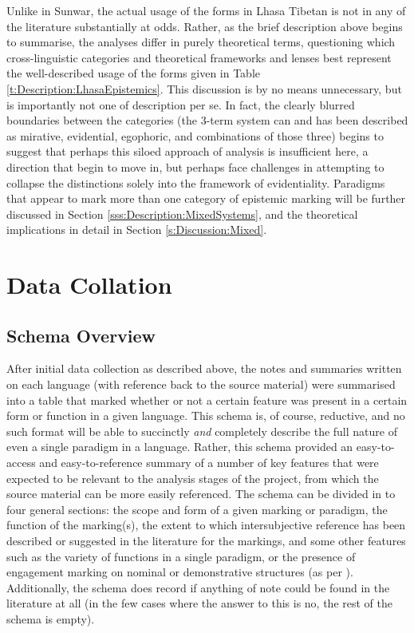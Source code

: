 Unlike in Sunwar, the actual usage of the forms in Lhasa Tibetan is not in any of the literature substantially at odds. Rather, as the brief description above begins to summarise, the analyses differ in purely theoretical terms, questioning which cross-linguistic categories and theoretical frameworks and lenses best represent the well-described usage of the forms given in Table \ref{t:Description:LhasaEpistemics}. This discussion is by no means unnecessary, but is importantly not one of description per se. In fact, the clearly blurred boundaries between the categories (the 3-term system can and has been described as mirative, evidential, egophoric, and combinations of those three) begins to suggest that perhaps this siloed approach of analysis is insufficient here, a direction that  begin to move in, but perhaps face challenges in attempting to collapse the distinctions solely into the framework of evidentiality. Paradigms that appear to mark more than one category of epistemic marking will be further discussed in Section \ref{sss:Description:MixedSystems}, and the theoretical implications in detail in Section \ref{s:Discussion:Mixed}.


\section{Data Collation}\label{s:Methods:Schema}
\subsection{Schema Overview}
After initial data collection as described above, the notes and summaries written on each language (with reference back to the source material) were summarised into a table that marked whether or not a certain feature was present in a certain form or function in a given language. This schema is, of course, reductive, and no such format will be able to succinctly \textit{and} completely describe the full nature of even a single paradigm in a language. Rather, this schema provided an easy-to-access and easy-to-reference summary of a number of key features that were expected to be relevant to the analysis stages of the project, from which the source material can be more easily referenced. The schema can be divided in to four general sections: the scope and form of a given marking or paradigm, the function of the marking(s), the extent to which intersubjective reference has been described or suggested in the literature for the markings, and some other features such as the variety of functions in a single paradigm, or the presence of engagement marking on nominal or demonstrative structures (as per ). Additionally, the schema does record if anything of note could be found in the literature at all (in the few cases where the answer to this is no, the rest of the schema is empty).

